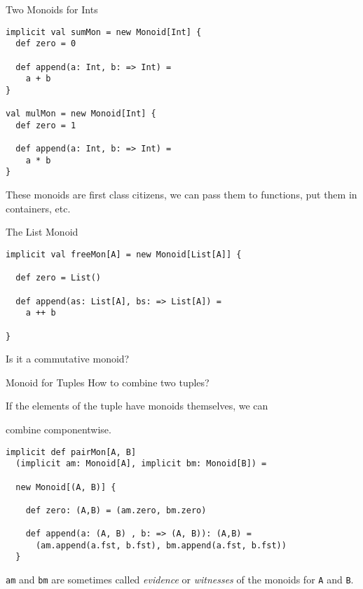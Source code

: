 \documentclass{beamer}
\begin{document}
\begin{frame}[fragile]{Two Monoids for Ints}
  \begin{block}{}
  \begin{lstlisting}
implicit val sumMon = new Monoid[Int] {
  def zero = 0

  def append(a: Int, b: => Int) =
    a + b
}

val mulMon = new Monoid[Int] {
  def zero = 1

  def append(a: Int, b: => Int) =
    a * b
}
  \end{lstlisting}
  \end{block}
  These monoids are first class citizens, we can pass them to
  functions, put them in containers, etc.
\end{frame}

\begin{frame}[fragile]{The List Monoid}
  \begin{block}{}

  \begin{lstlisting}
implicit val freeMon[A] = new Monoid[List[A]] {

  def zero = List()

  def append(as: List[A], bs: => List[A]) =
    a ++ b

}
  \end{lstlisting}
  \end{block}
Is it a commutative monoid?
\end{frame}

\begin{frame}[fragile]{Monoid for Tuples}
  How to combine two tuples?
  \pause

  If the elements of the tuple have monoids themselves,
  we can

  \alert{combine componentwise}.

  \pause
  \begin{block}{}
  \begin{lstlisting}
implicit def pairMon[A, B]
  (implicit am: Monoid[A], implicit bm: Monoid[B]) =

  new Monoid[(A, B)] {

    def zero: (A,B) = (am.zero, bm.zero)

    def append(a: (A, B) , b: => (A, B)): (A,B) =
      (am.append(a.fst, b.fst), bm.append(a.fst, b.fst))
  }
  \end{lstlisting}
  \end{block}

  \texttt{am} and \texttt{bm} are sometimes called \emph{evidence} or
  \emph{witnesses} of the monoids for \texttt{A} and \texttt{B}.
\end{frame}
\end{document}
